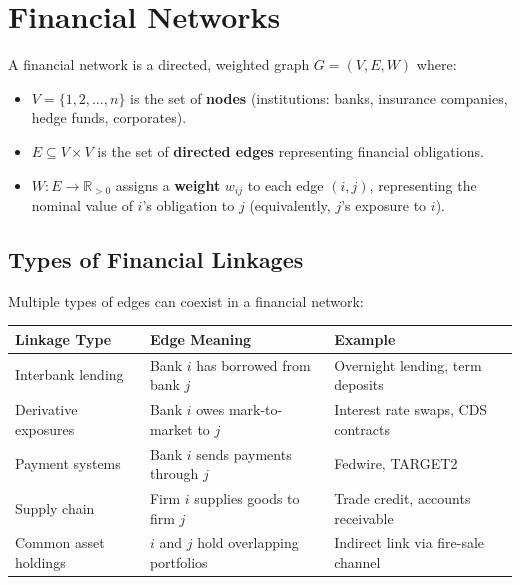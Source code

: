 \documentclass[11pt, a4paper]{article}
\theoremstyle{definition}
\theoremstyle{plain}
\theoremstyle{remark}
\newcommand{\RV}{\mathbb{R}}
\begin{document}
\section{Financial Networks}
\label{sec:financial-networks}

A financial network is a directed, weighted graph $G = (V, E, W)$ where:
\begin{itemize}
    \item $V = \{1, 2, \ldots, n\}$ is the set of \textbf{nodes} (institutions:
          banks, insurance companies, hedge funds, corporates).
    \item $E \subseteq V \times V$ is the set of \textbf{directed edges} representing
          financial obligations.
    \item $W: E \to \RV_{>0}$ assigns a \textbf{weight} $w_{ij}$ to each edge
          $(i, j)$, representing the nominal value of $i$'s obligation to $j$
          (equivalently, $j$'s exposure to $i$).
\end{itemize}

\subsection{Types of Financial Linkages}

Multiple types of edges can coexist in a financial network:

\begin{center}
\begin{tabular}{@{}p{3.5cm}p{4cm}p{5cm}@{}}
\toprule
\textbf{Linkage Type} & \textbf{Edge Meaning} & \textbf{Example} \\
\midrule
Interbank lending     & Bank $i$ has borrowed from bank $j$
                      & Overnight lending, term deposits \\[4pt]
Derivative exposures  & Bank $i$ owes mark-to-market to $j$
                      & Interest rate swaps, CDS contracts \\[4pt]
Payment systems       & Bank $i$ sends payments through $j$
                      & Fedwire, TARGET2 \\[4pt]
Supply chain          & Firm $i$ supplies goods to firm $j$
                      & Trade credit, accounts receivable \\[4pt]
Common asset holdings & $i$ and $j$ hold overlapping portfolios
                      & Indirect link via fire-sale channel \\
\bottomrule
\end{tabular}
\end{center}
\end{document}
